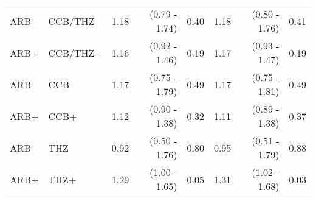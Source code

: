 \documentclass[11pt,]{article}
\begin{document}
\begin{table}[H]
{\begin{tabular}{llrrrrrr}
  ARB & CCB/THZ & 1.18 & (0.79 - 1.74) & 0.40 & 1.18 & (0.80 - 1.76) & 0.41 \\ 
  ARB+ & CCB/THZ+ & 1.16 & (0.92 - 1.46) & 0.19 & 1.17 & (0.93 - 1.47) & 0.19 \\ 
  ARB & CCB & 1.17 & (0.75 - 1.79) & 0.49 & 1.17 & (0.75 - 1.81) & 0.49 \\ 
  ARB+ & CCB+ & 1.12 & (0.90 - 1.38) & 0.32 & 1.11 & (0.89 - 1.38) & 0.37 \\ 
  ARB & THZ & 0.92 & (0.50 - 1.76) & 0.80 & 0.95 & (0.51 - 1.79) & 0.88 \\ 
  ARB+ & THZ+ & 1.29 & (1.00 - 1.65) & 0.05 & 1.31 & (1.02 - 1.68) & 0.03 \\ 
    \bottomrule
  \end{tabular}
  }
\end{table}
\begin{table}[H]
 \caption{Risk estimates for COVID-19 hospitalization across propensity score matched, prevalent-user cohorts in the VA-OMOP data source. We report uncalibrated and calibrated hazard ratios (HRs) and their 95\% confidence intervals (CIs). (+) indicates in-combination cohorts.}
\end{table}
\end{document}

